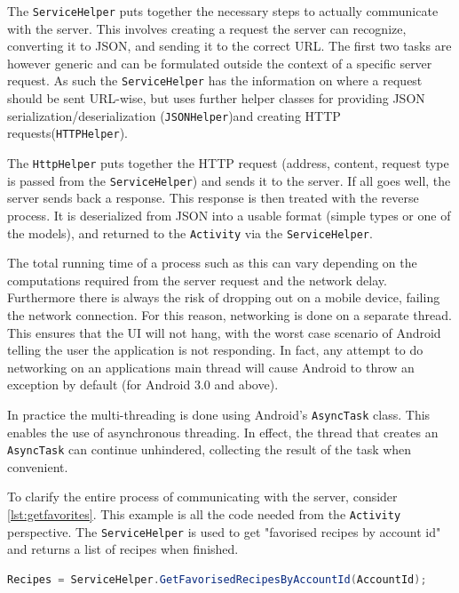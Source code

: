 The \texttt{ServiceHelper} puts together the necessary steps to actually communicate with the server. This involves creating a request the server can recognize, converting it to JSON, and sending it to the correct URL. The first two tasks are however generic and can be formulated outside the context of a specific server request. As such the \texttt{ServiceHelper} has the information on where a request should be sent URL-wise, but uses further helper classes for providing JSON serialization/deserialization (\texttt{JSONHelper})and creating HTTP requests(\texttt{HTTPHelper}).

The \texttt{HttpHelper} puts together the HTTP request (address, content, request type is passed from the \texttt{ServiceHelper}) and sends it to the server. If all goes well, the server sends back a response. This response is then treated with the reverse process. It is deserialized from JSON into a usable format (simple types or one of the models), and returned to the \texttt{Activity} via the \texttt{ServiceHelper}.

The total running time of a process such as this can vary depending on the computations required from the server request and the network delay. Furthermore there is always the risk of dropping out on a mobile device, failing the network connection. For this reason, networking is done on a separate thread. This ensures that the UI will not hang, with the worst case scenario of Android telling the user the application is not responding. In fact, any attempt to do networking on an applications main thread will cause Android to throw an exception by default (for Android 3.0 and above)\cite{networking_mainthread}.

In practice the multi-threading is done using Android's \texttt{AsyncTask} class. This enables the use of asynchronous threading. In effect, the thread that creates an \texttt{AsyncTask} can continue unhindered, collecting the result of the task when convenient\cite{asynctask}.


To clarify the entire process of communicating with the server, consider \ref{lst:getfavorites}. This example is all the code needed from the \texttt{Activity} perspective. The \texttt{ServiceHelper} is used to get "favorised recipes by account id" and returns a list of recipes when finished.

\begin{lstlisting}[language=java, label={lst:getfavorites}, caption={Sending a server request from an Activity}]
Recipes = ServiceHelper.GetFavorisedRecipesByAccountId(AccountId);
\end{lstlisting}

